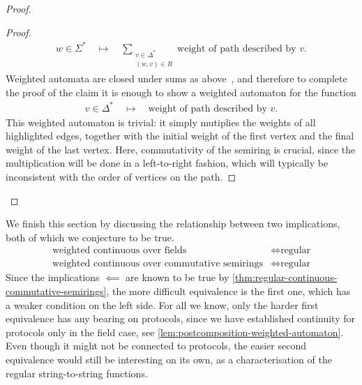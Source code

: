 \begin{proof}
\begin{proof}
\begin{align*}
    w \in \Sigma^* 
    \quad \mapsto \quad 
    \sum_{\substack{v \in \Delta^* \\ (w,v) \in R}} \text{weight of path described by $v$}.
    \end{align*} 
    Weighted automata are closed under sums as above~\cite[Lemma 8.12]{bojanczyk_automata_2025}, and therefore to complete the proof of the claim it is enough to show a weighted automaton for the function
    \begin{align*}
    v \in \Delta^* 
    \quad \mapsto \quad 
    \text{weight of path described by $v$}.
    \end{align*}
    This weighted automaton is trivial: it simply mutiplies the weights of all highlighted edges, together with the initial weight of the first vertex and the final weight of the last vertex. Here, commutativity of the semiring is crucial, since the multiplication will be done in a left-to-right fashion, which will typically be inconsistent with the order of vertices on the path. 
\end{proof}

\end{proof}

We finish this section by discussing the relationship between two implications, both of which we conjecture to be true.
\begin{align}
\text{weighted continuous over fields}
& \iff
\text{regular}
\label{eq:weighted-continuous-fields-again}\\
    \text{weighted continuous over commutative semirings}
& \iff
\text{regular}
\label{eq:weighted-continuous-commutative-semirings-again}
\end{align}
Since the implications $\impliedby$ are known to be true by \cref{thm:regular-continuous-commutative-semirings}, the more difficult equivalence is the first one, which has a weaker condition on the left side. 
For all we know, only the harder  first equivalence has any bearing on protocols, since we have established continuity for protocols only in the field case, see \cref{lem:postcomposition-weighted-automaton}. Even though it might not be connected to protocols, the  easier second equivalence would still be interesting on its own, as a characterisation of the regular string-to-string functions.
